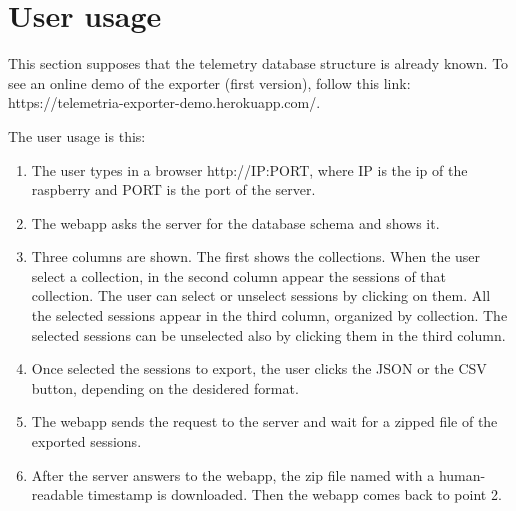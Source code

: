 \section{\huge{User usage}}
This section supposes that the telemetry database structure is already known.
To see an online demo of the exporter (first version), follow this link: https://telemetria-exporter-demo.herokuapp.com/.

The user usage is this:
\begin{enumerate}
    \item The user types in a browser http://IP:PORT, where IP is the ip of the raspberry and PORT is the port of the server.
    \item The webapp asks the server for the database schema and shows it.
    \item Three columns are shown. The first shows the collections. When the user select a collection, in the second column appear the sessions of that collection. The user can select or unselect sessions by clicking on them. All the selected sessions appear in the third column, organized by collection. The selected sessions can be unselected also by clicking them in the third column.
    \item Once selected the sessions to export, the user clicks the JSON or the CSV button, depending on the desidered format.
    \item The webapp sends the request to the server and wait for a zipped file of the exported sessions.
    \item After the server answers to the webapp, the zip file named with a human-readable timestamp is downloaded. Then the webapp comes back to point 2.
\end{enumerate}
